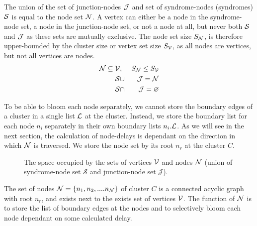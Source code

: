 The union of the set of junction-nodes $\mathcal{J}$ and set of syndrome-nodes (syndromes) $\mathcal{S}$ is equal to the node set $\mathcal{N}$. A vertex can either be a node in the syndrome-node set, a node in the junction-node set, or not a node at all, but never both $\mathcal{S}$ and $\mathcal{J}$ as these sets are mutually exclusive. The node set size $S_{\mathcal{N}}$, is therefore upper-bounded by the cluster size or vertex set size $S_{\mathcal{V}}$, as all nodes are vertices, but not all vertices are nodes.
\begin{eqnarray}
  \mathcal{N} \subseteq \mathcal{V} &,& S_{\mathcal{N}} \leq S_{\mathcal{V}} \label{eq:sets}  \\
  \nonumber \mathcal{S} &\cup& \mathcal{J} = \mathcal{N} \\
  \nonumber \mathcal{S} &\cap& \mathcal{J} = \varnothing
\end{eqnarray}

To be able to bloom each node separately, we cannot store the boundary edges of a cluster in a single list $\mathcal{L}$ at the cluster. Instead, we store the boundary list for each node $n_i$ separately in their own boundary lists $n_i.\mathcal{L}$. As we will see in the next section, the calculation of node-delays is dependant on the direction in which $\mathcal{N}$ is traversed. We store the node set by its root $n_r$ at the cluster $C$.

\begin{figure}
  \centering
  \caption{The space occupied by the sets of vertices $\mathcal{V}$ and nodes $\mathcal{N}$ (union of syndrome-node set $\mathcal{S}$ and junction-node set $\mathcal{J}$).}\label{fig:sets}
\end{figure}

\begin{theorem}
  The set of nodes $\mathcal{N} = \{n_1, n_2, .... n_{\mathcal{N}}\}$ of cluster $C$ is a connected acyclic graph with root $n_r$, and exists next to the exists set of vertices $\mathcal{V}$. The function of $\mathcal{N}$ is to store the list of boundary edges at the nodes and to selectively bloom each node dependant on some calculated delay.
\end{theorem}


